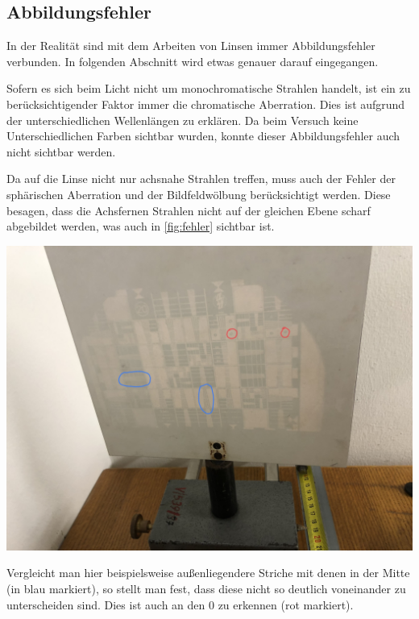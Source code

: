 \documentclass[11pt,ngerman]{scrartcl}
\begin{document}
\newpage

\subsection{Abbildungsfehler}

In der Realität sind mit dem Arbeiten von Linsen immer Abbildungsfehler verbunden. In folgenden Abschnitt wird etwas genauer darauf eingegangen.

\vspace{2mm}

Sofern es sich beim Licht nicht um monochromatische Strahlen handelt, ist ein zu berücksichtigender Faktor immer die chromatische Aberration. Dies ist aufgrund der unterschiedlichen Wellenlängen zu erklären. Da beim Versuch keine Unterschiedlichen Farben sichtbar wurden, konnte dieser Abbildungsfehler auch nicht sichtbar werden.

\vspace{2mm}

Da auf die Linse nicht nur achsnahe Strahlen treffen, muss auch der Fehler der sphärischen Aberration und der Bildfeldwölbung berücksichtigt werden. Diese besagen, dass die Achsfernen Strahlen nicht auf der gleichen Ebene scharf abgebildet werden, was auch in \autoref{fig:fehler} sichtbar ist.

\begin{center}
	\begin{minipage}[t]{\textwidth}
		\centering
		\includegraphics[width=\textwidth]{fehler}
		\label{fig:fehler}
	\end{minipage}
\end{center}
Vergleicht man hier beispielsweise außenliegendere Striche mit denen in der Mitte (in blau markiert), so stellt man fest, dass diese nicht so deutlich voneinander zu unterscheiden sind. Dies ist auch an den 0 zu erkennen (rot markiert).
\end{document}
